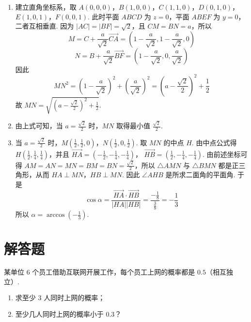 \begin{solution}
\begin{enumerate}
\item 建立直角坐标系，取 \(A(0,0,0)\)，\(B(1,0,0)\)，\(C(1,1,0)\)，\(D(0,1,0)\)，\(E(1,0,1)\)，\(F(0,0,1)\).
此时平面 \(ABCD\) 为 \(z=0\)，平面 \(ABEF\) 为 \(y=0\)，二者互相垂直. 因为 \(|AC|=|BF|=\sqrt{2}\)，且 \(CM=BN=a\)，所以
\[
M=C+\frac{a}{\sqrt{2}}\overrightarrow{CA}=\left(1-\frac{a}{\sqrt{2}},1-\frac{a}{\sqrt{2}},0\right)
\]
\[
N=B+\frac{a}{\sqrt{2}}\overrightarrow{BF}=\left(1-\frac{a}{\sqrt{2}},0,\frac{a}{\sqrt{2}}\right)
\]
因此
\[
MN^2=\left(1-\frac{a}{\sqrt{2}}\right)^2+\left(\frac{a}{\sqrt{2}}\right)^2=\left(a-\frac{\sqrt{2}}{2}\right)^2+\frac{1}{2}
\]
故 \(MN=\sqrt{\left(a-\frac{\sqrt{2}}{2}\right)^2+\frac{1}{2}}\).
\item 由上式可知，当 \(a=\frac{\sqrt{2}}{2}\) 时，\(MN\) 取得最小值 \(\frac{\sqrt{2}}{2}\).
\item 当 \(a=\frac{\sqrt{2}}{2}\) 时，\(M\left(\frac{1}{2},\frac{1}{2},0\right)\)，\(N\left(\frac{1}{2},0,\frac{1}{2}\right)\). 取 \(MN\) 的中点 \(H\). 由中点公式得 \(H\left(\frac{1}{2},\frac{1}{4},\frac{1}{4}\right)\)，并且
\(\overrightarrow{HA}=\left(-\frac{1}{2},-\frac{1}{4},-\frac{1}{4}\right)\)，
\(\overrightarrow{HB}=\left(\frac{1}{2},-\frac{1}{4},-\frac{1}{4}\right)\).
由前述坐标可得 \(AM=AN=MN=BM=BN=\frac{\sqrt{2}}{2}\)，所以 \(\triangle AMN\) 与 \(\triangle BMN\) 都是正三角形，从而 \(HA\perp MN\)，\(HB\perp MN\). 因此 \(\angle AHB\) 是所求二面角的平面角. 于是
\[
\cos\alpha=\frac{\overrightarrow{HA}\cdot\overrightarrow{HB}}{|HA||HB|}
=\frac{-\frac{1}{8}}{\frac{3}{8}}=-\frac{1}{3}
\]
所以 \(\alpha=\arccos\left(-\frac{1}{3}\right)\).
\end{enumerate}
\end{solution}

\section{解答题}
\begin{problem}
某单位 \(6\) 个员工借助互联网开展工作，每个员工上网的概率都是 \(0.5\)（相互独立）.

\begin{enumerate}
\item 求至少 \(3\) 人同时上网的概率；
\item 至少几人同时上网的概率小于 \(0.3\)？
\end{enumerate}
\end{problem}

